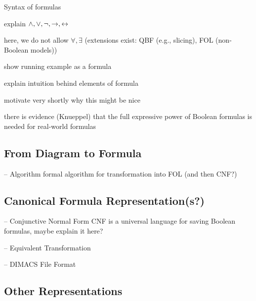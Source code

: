 \begin{frame}{\insertsubsection}
	Syntax of formulas

	explain $\wedge, \vee, \neg, \rightarrow, \leftrightarrow$

	here, we do not allow $\forall, \exists$ (extensions exist: QBF (e.g., slicing), FOL (non-Boolean models))
\end{frame}

\begin{frame}{\insertsubsection}
	show running example as a formula
	
	explain intuition behind elements of formula

	motivate very shortly why this might be nice

	there is evidence (Knueppel) that the full expressive power of Boolean formulas is needed for real-world formulas
\end{frame}

\subsection{From Diagram to Formula}

\begin{frame}{-- Algorithm}
	formal algorithm for transformation into FOL (and then CNF?)
\end{frame}

\subsection{Canonical Formula Representation(s?)}

\begin{frame}{-- Conjunctive Normal Form}
	CNF is a universal language for saving Boolean formulas, maybe explain it here?
\end{frame}

\begin{frame}{-- Equivalent Transformation}
	
\end{frame}

\begin{frame}{-- DIMACS File Format}
	
\end{frame}


\subsection{Other Representations} %

